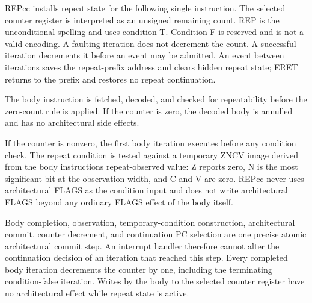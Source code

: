 REPcc installs repeat state for the following single instruction. The selected counter register is interpreted as an unsigned remaining count. REP is the unconditional spelling and uses condition T. Condition F is reserved and is not a valid encoding. A faulting iteration does not decrement the count. A successful iteration decrements it before an event may be admitted. An event between iterations saves the repeat-prefix address and clears hidden repeat state; ERET returns to the prefix and restores no repeat continuation.

The body instruction is fetched, decoded, and checked for repeatability before the zero-count rule is applied. If
the counter is zero, the decoded body is annulled and has no architectural side effects.

If the counter is nonzero, the first body iteration executes before any condition check. The repeat condition is
tested against a temporary ZNCV image derived from the body instruction\textquotesingle{}s repeat-observed value: Z reports zero, N is
the most significant bit at the observation width, and C and V are zero. REPcc never uses architectural FLAGS as the
condition input and does not write architectural FLAGS beyond any ordinary FLAGS effect of the body itself.

Body completion, observation, temporary-condition construction, architectural commit, counter decrement, and
continuation PC selection are one precise atomic architectural commit step. An interrupt handler therefore cannot
alter the continuation decision of an iteration that reached this step. Every completed body iteration decrements the
counter by one, including the terminating condition-false iteration. Writes by the body to the selected counter
register have no architectural effect while repeat state is active.
